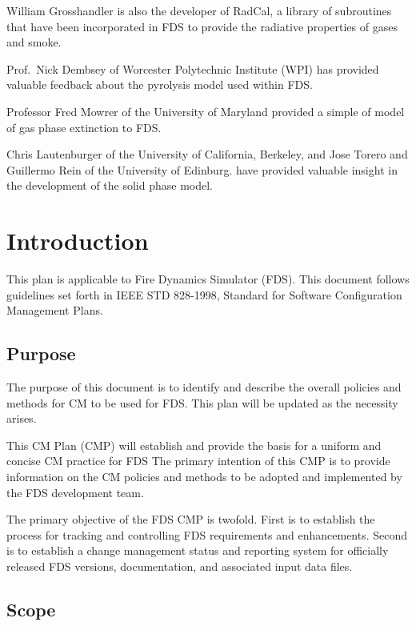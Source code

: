 \documentclass[11pt]{book}
\begin{document}
William Grosshandler is also the developer of RadCal, a library of
subroutines that have been incorporated in FDS to provide the
radiative properties of gases and smoke.

Prof.~Nick Dembsey of Worcester Polytechnic Institute (WPI) has provided valuable feedback about the pyrolysis
model used within FDS.

Professor Fred Mowrer of the University of Maryland provided a simple
of model of gas phase extinction to FDS.

Chris Lautenburger of the University of California, Berkeley, and Jose Torero and Guillermo Rein of the
University of Edinburg. have provided valuable insight in the development of the solid phase model.








\tableofcontents

\mainmatter

\chapter{Introduction}

This plan is applicable to Fire Dynamics Simulator (FDS).  This document follows guidelines set forth in IEEE 
STD 828-1998, Standard for Software Configuration Management Plans.

\section{Purpose}

The purpose of this document is to identify and describe the overall policies and methods for CM to be used for
FDS.  This plan will be updated as the necessity arises. 

This CM Plan (CMP) will establish and provide the basis for a uniform and concise CM practice for FDS
The primary intention of this CMP is to provide information on the CM policies and methods to be adopted and
implemented by the FDS development team.

The primary objective of the FDS CMP is twofold.  First is to establish the process for tracking and controlling
FDS requirements and enhancements.  Second is to establish a change management status and reporting system for
officially released FDS versions, documentation, and associated input data files.

\section{Scope}
\end{document}
